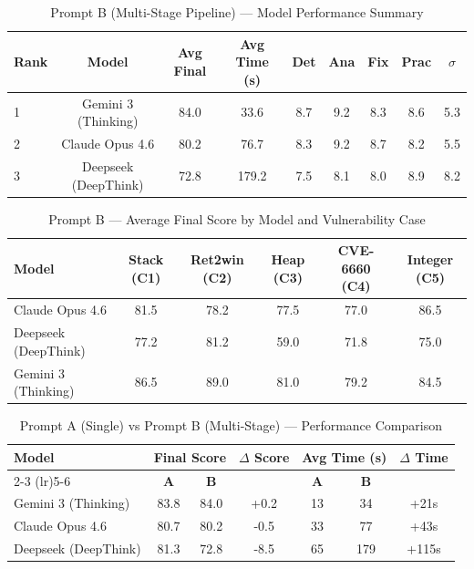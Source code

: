 \begin{table}[htbp]
\centering
\caption{Prompt B (Multi-Stage Pipeline) — Model Performance Summary}
\label{tab:prompt_b_rankings}
\begin{tabular}{lcccccccc}
\toprule
\textbf{Rank} & \textbf{Model} & \textbf{Avg Final} & \textbf{Avg Time (s)} & \textbf{Det} & \textbf{Ana} & \textbf{Fix} & \textbf{Prac} & \textbf{$\sigma$} \\
\midrule
1 & Gemini 3 (Thinking) & 84.0 & 33.6 & 8.7 & 9.2 & 8.3 & 8.6 & 5.3 \\
2 & Claude Opus 4.6 & 80.2 & 76.7 & 8.3 & 9.2 & 8.7 & 8.2 & 5.5 \\
3 & Deepseek (DeepThink) & 72.8 & 179.2 & 7.5 & 8.1 & 8.0 & 8.9 & 8.2 \\
\bottomrule
\end{tabular}
\end{table}

\begin{table}[htbp]
\centering
\caption{Prompt B — Average Final Score by Model and Vulnerability Case}
\label{tab:prompt_b_per_case}
\begin{tabular}{lccccc}
\toprule
\textbf{Model} & \textbf{Stack (C1)} & \textbf{Ret2win (C2)} & \textbf{Heap (C3)} & \textbf{CVE-6660 (C4)} & \textbf{Integer (C5)} \\
\midrule
Claude Opus 4.6 & 81.5 & 78.2 & 77.5 & 77.0 & 86.5 \\
Deepseek (DeepThink) & 77.2 & 81.2 & 59.0 & 71.8 & 75.0 \\
Gemini 3 (Thinking) & 86.5 & 89.0 & 81.0 & 79.2 & 84.5 \\
\bottomrule
\end{tabular}
\end{table}

\begin{table}[htbp]
\centering
\caption{Prompt A (Single) vs Prompt B (Multi-Stage) — Performance Comparison}
\label{tab:prompt_a_vs_b}
\begin{tabular}{lcccccc}
\toprule
\textbf{Model} & \multicolumn{2}{c}{\textbf{Final Score}} & \textbf{$\Delta$ Score} & \multicolumn{2}{c}{\textbf{Avg Time (s)}} & \textbf{$\Delta$ Time} \\
\cmidrule(lr){2-3} \cmidrule(lr){5-6}
 & \textbf{A} & \textbf{B} & & \textbf{A} & \textbf{B} & \\
\midrule
Gemini 3 (Thinking) & 83.8 & 84.0 & +0.2 & 13 & 34 & +21s \\
Claude Opus 4.6 & 80.7 & 80.2 & -0.5 & 33 & 77 & +43s \\
Deepseek (DeepThink) & 81.3 & 72.8 & -8.5 & 65 & 179 & +115s \\
\bottomrule
\end{tabular}
\end{table}
